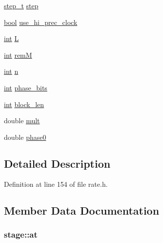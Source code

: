 \begin{DoxyCompactItemize}
\item 
\hyperlink{unionstep__t}{step\+\_\+t} \hyperlink{structstage_a79113b34a0789d5bb186a165fa72a12b}{step}
\item 
\hyperlink{mac_2config_2i386_2lib-src_2libsoxr_2soxr-config_8h_abb452686968e48b67397da5f97445f5b}{bool} \hyperlink{structstage_a055cf3bb2bc06f93608c55a2e62cac08}{use\+\_\+hi\+\_\+prec\+\_\+clock}
\item 
\hyperlink{xmltok_8h_a5a0d4a5641ce434f1d23533f2b2e6653}{int} \hyperlink{structstage_a5d95711da91e09f4da9f723556053c0d}{L}
\item 
\hyperlink{xmltok_8h_a5a0d4a5641ce434f1d23533f2b2e6653}{int} \hyperlink{structstage_a6cec088be13e9f4651447cd82b73da98}{remM}
\item 
\hyperlink{xmltok_8h_a5a0d4a5641ce434f1d23533f2b2e6653}{int} \hyperlink{structstage_a73628f0c9db77692ddd88d0b1474de36}{n}
\item 
\hyperlink{xmltok_8h_a5a0d4a5641ce434f1d23533f2b2e6653}{int} \hyperlink{structstage_af0ad7a7e28b00424a27021aa6809f962}{phase\+\_\+bits}
\item 
\hyperlink{xmltok_8h_a5a0d4a5641ce434f1d23533f2b2e6653}{int} \hyperlink{structstage_a3ff2a6585177f53408eac1d1b008f7ea}{block\+\_\+len}
\item 
double \hyperlink{structstage_a3cb7ea04aa9e3e145b0607f6244cb8de}{mult}
\item 
double \hyperlink{structstage_a1422b852a194f9e781d662656d60f37c}{phase0}
\end{DoxyCompactItemize}


\subsection{Detailed Description}


Definition at line 154 of file rate.\+h.



\subsection{Member Data Documentation}
\subsubsection[{\texorpdfstring{at}{at}}]{ stage\+::at}\hypertarget{structstage_af270461827df216ffa9e0737886bc646}{}\label{structstage_af270461827df216ffa9e0737886bc646}


